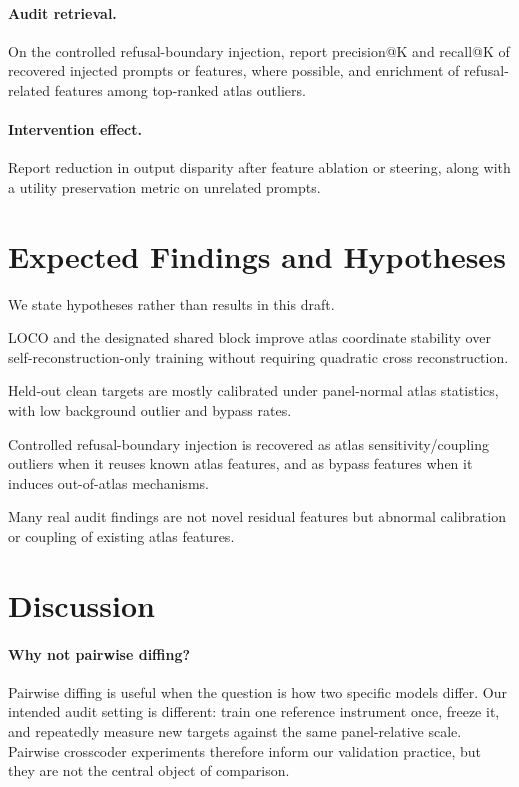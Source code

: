 \documentclass[11pt]{article}
\begin{document}
\paragraph{Audit retrieval.}
On the controlled refusal-boundary injection, report precision@K and recall@K of recovered injected prompts or features, where possible, and enrichment of refusal-related features among top-ranked atlas outliers.

\paragraph{Intervention effect.}
Report reduction in output disparity after feature ablation or steering, along with a utility preservation metric on unrelated prompts.

\section{Expected Findings and Hypotheses}

We state hypotheses rather than results in this draft.

\begin{description}[leftmargin=2.8em,labelwidth=2.2em,labelsep=0.4em]
    \item[H1:] LOCO and the designated shared block improve atlas coordinate stability over self-reconstruction-only training without requiring quadratic cross reconstruction.
    \item[H2:] Held-out clean targets are mostly calibrated under panel-normal atlas statistics, with low background outlier and bypass rates.
    \item[H3:] Controlled refusal-boundary injection is recovered as atlas sensitivity/coupling outliers when it reuses known atlas features, and as bypass features when it induces out-of-atlas mechanisms.
    \item[H4:] Many real audit findings are not novel residual features but abnormal calibration or coupling of existing atlas features.
\end{description}

\section{Discussion}

\paragraph{Why not pairwise diffing?}
Pairwise diffing is useful when the question is how two specific models differ. Our intended audit setting is different: train one reference instrument once, freeze it, and repeatedly measure new targets against the same panel-relative scale. Pairwise crosscoder experiments therefore inform our validation practice, but they are not the central object of comparison.
\end{document}
